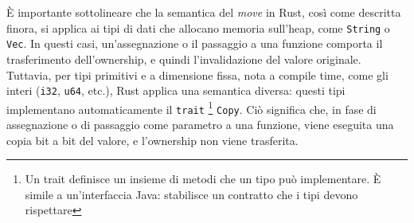È importante sottolineare che la semantica del \textit{move} in Rust, così come descritta finora, si applica ai tipi di dati che allocano memoria sull'heap, come \texttt{String} o \texttt{Vec}. In questi casi, un'assegnazione o il passaggio a una funzione comporta il trasferimento dell'ownership, e quindi l'invalidazione del valore originale. Tuttavia, per tipi primitivi e a dimensione fissa, nota a compile time, come gli interi (\texttt{i32}, \texttt{u64}, etc.), Rust applica una semantica diversa: questi tipi implementano automaticamente il \texttt{trait} \footnote{Un trait definisce un insieme di metodi che un tipo può implementare. È simile a un'interfaccia Java: stabilisce un contratto che i tipi devono rispettare} \texttt{Copy}. Ciò significa che, in fase di assegnazione o di passaggio come parametro a una funzione, viene eseguita una copia bit a bit del valore, e l'ownership non viene trasferita.

